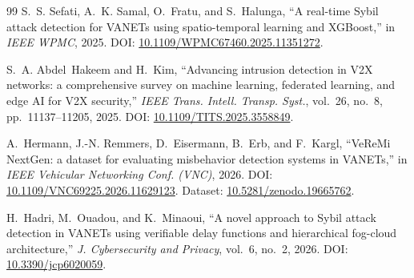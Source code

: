 \documentclass[journal,twoside]{IEEEtran}
\begin{document}
\begin{thebibliography}{99}
 S.~S. Sefati, A.~K. Samal, O.~Fratu, and S.~Halunga, ``A real-time Sybil attack detection for VANETs using spatio-temporal learning and XGBoost,'' in \emph{IEEE WPMC}, 2025. DOI: \url{10.1109/WPMC67460.2025.11351272}.

 S.~A. Abdel~Hakeem and H.~Kim, ``Advancing intrusion detection in V2X networks: a comprehensive survey on machine learning, federated learning, and edge AI for V2X security,'' \emph{IEEE Trans. Intell. Transp. Syst.}, vol.~26, no.~8, pp.~11137--11205, 2025. DOI: \url{10.1109/TITS.2025.3558849}.

 A.~Hermann, J.-N. Remmers, D.~Eisermann, B.~Erb, and F.~Kargl, ``VeReMi NextGen: a dataset for evaluating misbehavior detection systems in VANETs,'' in \emph{IEEE Vehicular Networking Conf. (VNC)}, 2026. DOI: \url{10.1109/VNC69225.2026.11629123}. Dataset: \url{10.5281/zenodo.19665762}.

 H.~Hadri, M.~Ouadou, and K.~Minaoui, ``A novel approach to Sybil attack detection in VANETs using verifiable delay functions and hierarchical fog-cloud architecture,'' \emph{J. Cybersecurity and Privacy}, vol.~6, no.~2, 2026. DOI: \url{10.3390/jcp6020059}.

\end{thebibliography}

\begin{IEEEbiographynophoto}{Hannan Muzammil}
%
\thanks{H. Muzammil is with Hannsoft (e-mail: abdullhannan
\end{IEEEbiographynophoto}
\end{document}

